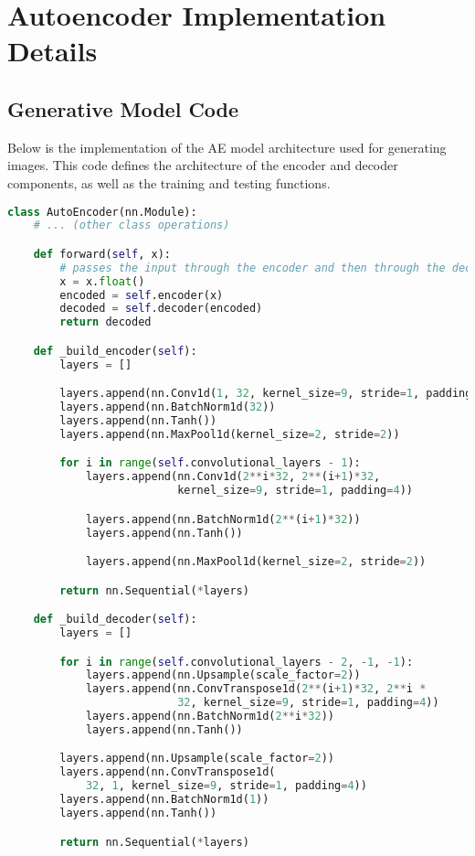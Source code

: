\chapter{Autoencoder Implementation Details} \label{ann:AE}

\section{Generative Model Code}
Below is the implementation of the \ac{AE} model architecture used for generating images. This code defines the architecture of the encoder and decoder components, as well as the training and testing functions.

\begin{lstlisting}[language=Python, caption={Model architecture}]
class AutoEncoder(nn.Module):
    # ... (other class operations)

    def forward(self, x):
        # passes the input through the encoder and then through the decoder
        x = x.float()
        encoded = self.encoder(x)
        decoded = self.decoder(encoded)
        return decoded

    def _build_encoder(self):
        layers = []

        layers.append(nn.Conv1d(1, 32, kernel_size=9, stride=1, padding=4))
        layers.append(nn.BatchNorm1d(32))
        layers.append(nn.Tanh())
        layers.append(nn.MaxPool1d(kernel_size=2, stride=2))

        for i in range(self.convolutional_layers - 1):
            layers.append(nn.Conv1d(2**i*32, 2**(i+1)*32,
                          kernel_size=9, stride=1, padding=4))

            layers.append(nn.BatchNorm1d(2**(i+1)*32))
            layers.append(nn.Tanh())

            layers.append(nn.MaxPool1d(kernel_size=2, stride=2))

        return nn.Sequential(*layers)

    def _build_decoder(self):
        layers = []

        for i in range(self.convolutional_layers - 2, -1, -1):
            layers.append(nn.Upsample(scale_factor=2))
            layers.append(nn.ConvTranspose1d(2**(i+1)*32, 2**i *
                          32, kernel_size=9, stride=1, padding=4))
            layers.append(nn.BatchNorm1d(2**i*32))
            layers.append(nn.Tanh())

        layers.append(nn.Upsample(scale_factor=2))
        layers.append(nn.ConvTranspose1d(
            32, 1, kernel_size=9, stride=1, padding=4))
        layers.append(nn.BatchNorm1d(1))
        layers.append(nn.Tanh())

        return nn.Sequential(*layers)
\end{lstlisting}

